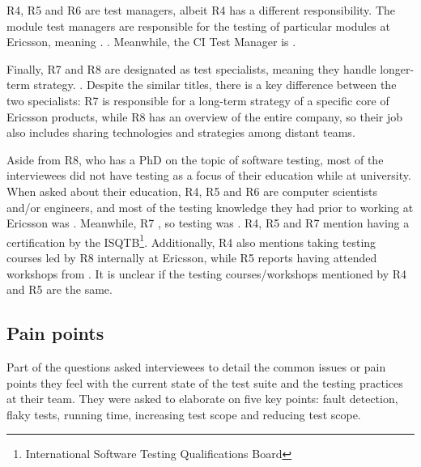 R4, R5 and R6 are test managers, albeit R4 has a different responsibility.
The module test managers are responsible for the testing of particular modules at Ericsson, meaning .
.
Meanwhile, the CI Test Manager is .

Finally, R7 and R8 are designated as test specialists, meaning they handle longer-term strategy.
.
Despite the similar titles, there is a key difference between the two specialists: R7 is responsible for a long-term strategy of a specific core of Ericsson products, while R8 has an overview of the entire company, so their job also includes sharing technologies and strategies among distant teams.

Aside from R8, who has a PhD on the topic of software testing, most of the interviewees did not have testing as a focus of their education while at university.
When asked about their education, R4, R5 and R6 are computer scientists and/or engineers, and most of the testing knowledge they had prior to working at Ericsson was .
Meanwhile, R7 , so testing was .
R4, R5 and R7 mention having a certification by the ISQTB\footnote{International Software Testing Qualifications Board}.
Additionally, R4 also mentions taking testing courses led by R8 internally at Ericsson, while R5 reports having attended workshops from .
It is unclear if the testing courses/workshops mentioned by R4 and R5 are the same.

\subsection{Pain points}

Part of the questions asked interviewees to detail the common issues or pain points they feel with the current state of the test suite and the testing practices at their team.
They were asked to elaborate on five key points: fault detection, flaky tests, running time, increasing test scope and reducing test scope.

